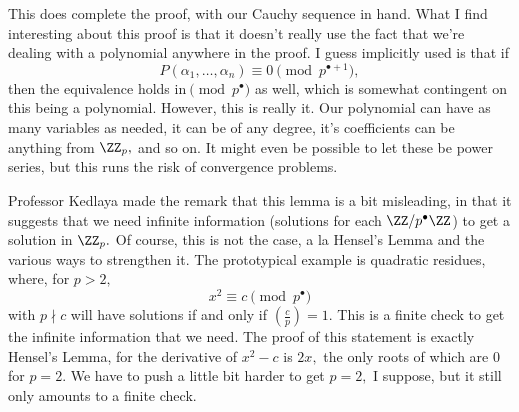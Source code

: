 This does complete the proof, with our Cauchy sequence in hand. What I find interesting about this proof is that it doesn't really use the fact that we're dealing with a polynomial anywhere in the proof. I guess implicitly used is that if
\[P(\alpha_1,\ldots,\alpha_n)\equiv0\pmod{p^{\bullet+1}},\]
then the equivalence holds in$\pmod{p^\bullet}$ as well, which is somewhat contingent on this being a polynomial. However, this is really it. Our polynomial can have as many variables as needed, it can be of any degree, it's coefficients can be anything from $\ZZ_p,$ and so on. It might even be possible to let these be power series, but this runs the risk of convergence problems.

Professor Kedlaya made the remark that this lemma is a bit misleading, in that it suggests that we need infinite information (solutions for each $\ZZ/p^\bullet\ZZ$) to get a solution in $\ZZ_p.$ Of course, this is not the case, a la Hensel's Lemma and the various ways to strengthen it. The prototypical example is quadratic residues, where, for $p>2,$
\[x^2\equiv c\pmod{p^\bullet}\]
with $p\nmid c$ will have solutions if and only if $\left(\frac cp\right)=1.$ This is a finite check to get the infinite information that we need. The proof of this statement is exactly Hensel's Lemma, for the derivative of $x^2-c$ is $2x,$ the only roots of which are $0$ for $p=2.$ We have to push a little bit harder to get $p=2,$ I suppose, but it still only amounts to a finite check.